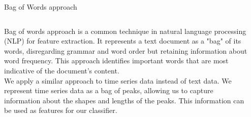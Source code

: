 \begin{frame}{Bag of Words approach}
    \begin{columns}[T]
    \begin{column}{0.8\textwidth}
    Bag of words approach is a common technique in natural language processing (NLP) for feature extraction. It represents a text document as a "bag" of its words, disregarding grammar and word order but retaining information about word frequency. This approach identifies important words that are most indicative of the document's content.\pause\\\vspace{1cm}
    We apply a similar approach to time series data instead of text data. We represent time series data as a bag of peaks, allowing us to capture information about the shapes and lengths of the peaks. This information can be used as features for our classifier.
    \end{column}
    \begin{column}{0.3\textwidth}
        




\begin{tikzpicture}[x=0.75pt,y=0.75pt,yscale=-1,xscale=1.5]


\end{tikzpicture}
\end{column}
\end{columns}
\end{frame}
